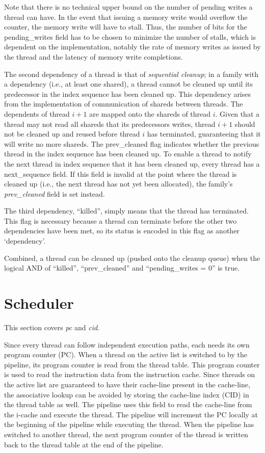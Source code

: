 Note that there is no technical upper bound on the number of pending writes a thread can have. In the event that issuing a memory write would overflow the counter, the memory write will have to stall. Thus, the number of bits for the pending\_writes field has to be chosen to minimize the number of stalls, which is dependent on the implementation, notably the rate of memory writes as issued by the thread and the latency of memory write completions.

The second dependency of a thread is that of \emph{sequential cleanup}; in a family with a dependency (i.e., at least one shared), a thread cannot be cleaned up until its predecessor in the index sequence has been cleaned up. This dependency arises from the implementation of communication of shareds between threads. The dependents of thread $i+1$ are mapped onto the shareds of thread $i$. Given that a thread may not read all shareds that its predecessors writes, thread $i+1$ should not be cleaned up and reused before thread $i$ has terminated, guaranteeing that it will write no more shareds. The prev\_cleaned flag indicates whether the previous thread in the index sequence has been cleaned up. To enable a thread to notify the next thread in index sequence that it has been cleaned up, every thread has a next\_sequence field. If this field is invalid at the point where the thread is cleaned up (i.e., the next thread has not yet been allocated), the family's \emph{prev\_cleaned} field is set instead.

The third dependency, ``killed'', simply means that the thread has terminated. This flag is necessary because a thread can terminate before the other two dependencies have been met, so its status is encoded in this flag as another `dependency'.

Combined, a thread can be cleaned up (pushed onto the cleanup queue) when the logical AND of ``killed'', ``prev\_cleaned'' and ``pending\_writes = 0'' is true.

\section{Scheduler}
This section covers \emph{pc} and \emph{cid}.

Since every thread can follow independent execution paths, each needs its own program counter (PC). When a thread on the active list is switched to by the pipeline, its program counter is read from the thread table. This program counter is used to read the instruction data from the instruction cache. Since threads on the active list are guaranteed to have their cache-line present in the cache-line, the associative lookup can be avoided by storing the cache-line index (CID) in the thread table as well. The pipeline uses this field to read the cache-line from the i-cache and execute the thread. The pipeline will increment the PC locally at the beginning of the pipeline while executing the thread. When the pipeline has switched to another thread, the next program counter of the thread is written back to the thread table at the end of the pipeline.

